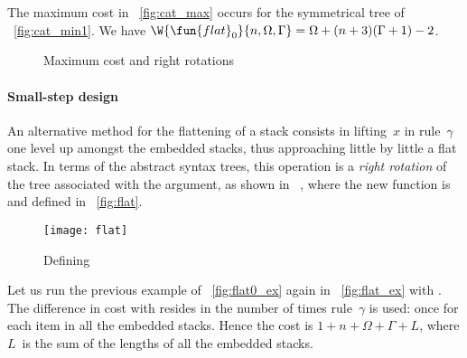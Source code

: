The maximum cost in
\fig~\ref{fig:cat_max} occurs for the symmetrical tree of
\fig~\ref{fig:cat_min1}. We
have
\(\W{\fun{flat}_0}{n,\Omega,\Gamma} = \Omega + (n+3)(\Gamma+1) - 2\).
\begin{figure}[t]
\centering
{}
\qquad
{}
\qquad
{}
\caption{Maximum cost and right rotations}
\end{figure}

\paragraph{Small-step design}

An alternative method for the flattening of a stack consists in
lifting~\(x\) in rule~\(\gamma\) one level up amongst the embedded
stacks, thus approaching little by little a flat stack. In terms of
the abstract syntax trees, this operation is a \emph{right
rotation} of the tree associated with the
argument, as shown in \figs~, where
the new function is  and
defined in \fig~\vref{fig:flat}.
%
\begin{figure}
\centering
\texttt{[image: flat]}%
\caption{Defining }
\label{fig:flat}
\end{figure}
Let us run the previous example of
\fig~\vref{fig:flat0_ex} again in \fig~\vref{fig:flat_ex} with
. The difference in cost with
 resides in the number
of times rule~\(\gamma\) is used: once for each item in all the
embedded stacks. Hence the
cost\label{cost:flat} is \(1 + n + \Omega
+ \Gamma + L\), where \(L\)~is the sum of the lengths of all the
embedded stacks.

